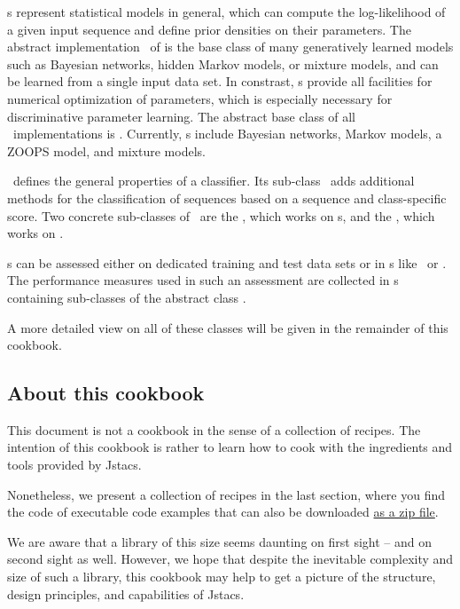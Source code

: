 \StatMod s represent statistical models in general, which can compute the log-likelihood of a given input sequence and define prior densities on their parameters. The abstract implementation \AbstractTrainSM~of \TrainSM is the base class of many generatively learned models such as Bayesian networks, hidden Markov models, or mixture models, and can be learned from a single input data set. In constrast, \DiffSM s provide all facilities for numerical optimization of parameters, which is especially necessary for discriminative parameter learning. The abstract base class of all \DiffSM~implementations is \AbstractDiffSM. Currently, \DiffSM s include Bayesian networks, Markov models, a ZOOPS model, and mixture models.

\AbstractClassifier~defines the general properties of a classifier. Its sub-class \AbstractScoreBasedClassifier~adds additional methods for the classification of sequences based on a sequence and class-specific score.
Two concrete sub-classes of \AbstractScoreBasedClassifier~are the \TrainSMBasedClassifier, which works on \TrainSM s, and the \GenDisMixClassifier, which works on \DiffSM.

\AbstractClassifier s can be assessed either on dedicated training and test data sets or in \ClassifierAssessment s like \KFoldCrossValidation~or \RepeatedHoldOutExperiment. The performance measures used in such an assessment are collected in \PerformanceMeasureParameterSet s containing sub-classes of the abstract class \AbstractPerformanceMeasure.

A more detailed view on all of these classes will be given in the remainder of this cookbook.

\subsection{About this cookbook}

This document is not a cookbook in the sense of a collection of recipes. The intention of this cookbook is rather to learn how to cook with the ingredients and tools provided by Jstacs.

Nonetheless, we present a collection of recipes in the last section, where you find the code of executable code examples that can also be downloaded \href{http://www.jstacs.de/downloads/recipes.zip}{as a zip file}.

We are aware that a library of this size seems daunting on first sight -- and on second sight as well. However, we hope that despite the inevitable complexity and size of such a library, this cookbook may help to get a picture of the structure, design principles, and capabilities of Jstacs.

